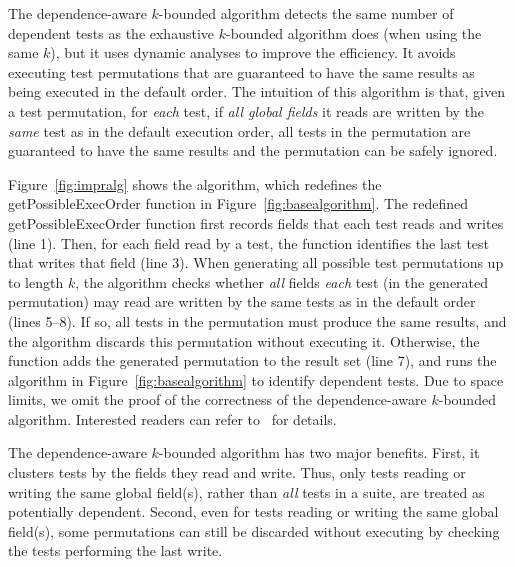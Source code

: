 
The dependence-aware $k$-bounded algorithm
detects the same number of dependent tests
as the exhaustive $k$-bounded algorithm does (when using the same $k$),
but it uses dynamic analyses to improve the efficiency.
It avoids executing test
permutations that are guaranteed to have the
same results as being executed in the default order.
The intuition of this algorithm is that,
given a test permutation, for \textit{each}
test, if \textit{all global fields} it reads
are written by the \textit{same} test as
in the default execution order, all tests in
the permutation are guaranteed to
have the same results and the permutation can be safely ignored. 

Figure~\ref{fig:impralg} shows the algorithm, which redefines
the getPossibleExecOrder function in Figure~\ref{fig:basealgorithm}.
The redefined getPossibleExecOrder function first records
fields that each test reads and writes (line 1).
Then, for each field read by a test,
the function identifies the last test that writes
that field (line 3).
When generating all possible test permutations
up to length $k$, the algorithm checks whether
\textit{all} fields \textit{each} test (in the generated permutation)
may read are written by the same tests as in the
default order (lines 5--8). If so, all tests in the permutation
must produce the same results, and the algorithm discards
this permutation without executing it. Otherwise,
the function adds the generated permutation to the result
set (line 7), and runs the algorithm in Figure~\ref{fig:basealgorithm}
to identify dependent tests. %
Due to space limits, we omit the proof of the correctness
of the dependence-aware $k$-bounded algorithm. Interested
readers can refer to~\cite{proof-dependence-aware} for details.

The dependence-aware $k$-bounded algorithm has two major benefits.
First, it clusters tests by the fields they
read and write. Thus, only tests reading or writing
the same global field(s), rather than \textit{all} tests
in a suite, are treated as potentially dependent.
Second, even for tests reading or writing the same global
field(s), some permutations can still be discarded
without executing by checking the tests performing the last write.


